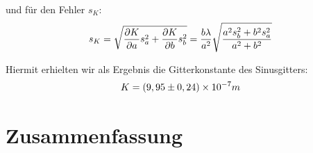 \documentclass[12pt]{article}
\begin{document}
und für den Fehler $s_K$:
\begin{align}
\notag
 s_K=\sqrt{\frac{\partial K}{\partial a}s_a^2+\frac{\partial K}{\partial b}s_b^2}=\frac{b\lambda}{a^2}\sqrt{\frac{a^2s_b^2+b^2s_a^2}{a^2+b^2}}
\end{align}

Hiermit erhielten wir als Ergebnis die Gitterkonstante des Sinusgitters:
\begin{align}
\notag
 K=(9,95\pm0,24)\times10^{-7}m
\end{align}

\section{Zusammenfassung}
\end{document}
